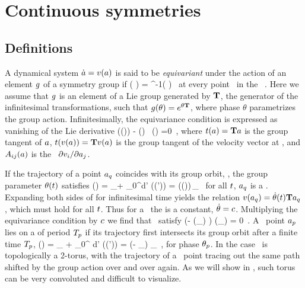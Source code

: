 \section{Continuous symmetries}
\label{s:symm}

\subsection{Definitions}
\label{s:Definitions}

A dynamical system $\dot{a}=v(a)$ is said to be
\emph{equivariant} under the action of an element $g$ of a
symmetry group if
\beq
	\vel( \ssp ) =  \LieEl^{-1}\vel( \LieEl \ssp )
	\,
at every point \ssp\ in the \statesp\ \pS. Here we assume that $g$
is an element of a Lie group generated by $\mathbf{T}$, the generator of the
infinitesimal transformations, such that $g(\theta) = e^{\theta
\mathbf{T}}$, where phase $\theta$ parametrizes the group action.
Infinitesimally, the equivariance condition
 is expressed as vanishing of
the Lie derivative
\beq
  \groupTan(\vel(\ssp))  - \Mvar(\ssp) \, \groupTan(\ssp) =0
  \,,
where
$ t(a) = \mathbf{T} a $ is the group tangent of $a$,
$ t(v(a)) = \mathbf{T} v(a) $ is the group tangent of
the velocity vector at \ssp,
and $A_{ij}(a)$ is the \stabmat\
${\partial v_i}/{\partial a_j}$.

If the trajectory of a point $a_q$ coincides with its group
orbit, \ie, the group parameter $\theta (t)$ satisfies
\beq
\ssp (\zeit)
    = \ssp_\stagn + \int_0^\zeit \!\!d\zeit' \vel(\ssp (\zeit'))
    = \LieEl (\theta (\zeit))\,\ssp_\stagn
  \,
for all $t$, $a_q$ is a \emph{\reqv}. Expanding
both sides of  for infinitesimal time yields the
relation $v(a_q) = \dot{\theta}(t) \mathbf{T} a_q$, which
must hold for all $t$. Thus for a \reqv\ the  \emph{\phaseVel}
is a constant, $\dot{\theta} = c$. Multiplying the equivariance condition
\refeq{inftmInv} by $c$ we find that \reqva\ satisfy
\beq
(\velRel \Lg - \Mvar (\ssp_\stagn) ) \vel (\ssp_\stagn) = 0
\,.
A \statesp\ point $a_{p}$ lies on a \emph{\rpo} of period
${T_{p}}$ if its trajectory first intersects its group orbit after
a finite time ${T_{p}}$,
\beq
\ssp(\period{\rpprime})
    = \ssp_\rpprime
     + \int_0^\period{\rpprime} \!\!\!d\tau' \vel(\ssp (\tau'))
    = \LieEl (- \theta_\rpprime ) \ssp_\rpprime
  \,,
for phase $\theta_{p}$. In the  case \rpo\ is
topologically a 2-torus, with the trajectory of a \rpo\ point tracing out the
same path shifted by the group action over and over again. As we will
show in \refsect{s:numerics}, such torus can be very convoluted and
difficult to visualize.

